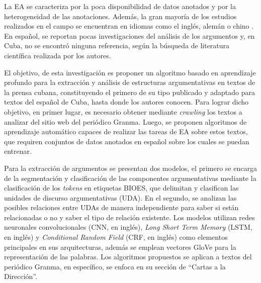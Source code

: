 \documentclass[a4paper,11pt,twocolumn,twoside]{article}
\begin{document}
La EA se caracteriza por la poca disponibilidad de datos anotados y 
por la heterogeneidad de las 
anotaciones. Además, la gran mayoría de los estudios realizados en el campo se encuentran en 
idiomas como el inglés, alemán o chino \cite{eger2018cross}. 
En español, se reportan pocas investigaciones del análisis de los argumentos \cite{esteve2020mineria} y, en 
Cuba, no se encontró ninguna referencia, según la búsqueda de literatura científica
realizada por los autores.



El objetivo, de esta investigación es proponer un algoritmo basado en aprendizaje profundo 
para la extracción y análisis de estructuras argumentativas en textos 
de la prensa cubana, constituyendo el primero de su tipo publicado y adaptado para
textos del español de Cuba, hasta donde los autores conocen. 
Para lograr dicho objetivo, en primer lugar, es necesario obtener mediante \textit{crawling} los textos a analizar del sitio 
web del periódico Granma. Luego, se proponen algoritmos de aprendizaje automático capaces de realizar las tareas 
de EA sobre estos textos, que requiren conjuntos 
de datos anotados en español sobre los cuales se puedan entrenar.

Para la extracción
de argumentos se presentan dos modelos, el primero se encarga de la segmentación y clasificación
de las componentes argumentativas mediante la clasificación de los \textit{tokens} en etiquetas BIOES, que 
delimitan y clasifican las unidades de discurso argumentativas (UDA). En el segundo, se analizan 
las posibles relaciones entre UDAs de manera independiente para saber si están relacionadas o no y saber
el tipo de relación existente. Los modelos utilizan 
redes neuronales convolucionales (CNN, en inglés), \textit{Long Short Term Memory} (LSTM, en inglés) \cite{hochreiter1997long} y \textit{Conditional Random Field} (CRF, en inglés) \cite{lafferty2001conditional}
como elementos principales en sus arquitecturas, además se emplean vectores GloVe \cite{pennington2014glove} para la representación
de las palabras. Los algoritmos propuestos se aplican a textos del periódico Granma, 
en específico, se enfoca en su sección de ``Cartas a la Dirección''.
\end{document}
